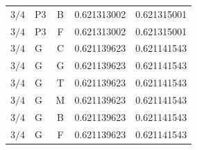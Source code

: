 \begin{longtable}{clcrr}
$3/4$ & P3 & B & 0.621313002 & 0.621315001 \\
$3/4$ & P3 & F & 0.621313002 & 0.621315001 \\
$3/4$ & G & C & 0.621139623 & 0.621141543 \\
$3/4$ & G & G & 0.621139623 & 0.621141543 \\
$3/4$ & G & T & 0.621139623 & 0.621141543 \\
$3/4$ & G & M & 0.621139623 & 0.621141543 \\
$3/4$ & G & B & 0.621139623 & 0.621141543 \\
$3/4$ & G & F & 0.621139623 & 0.621141543 \\
\hline\end{longtable}\normalsize
